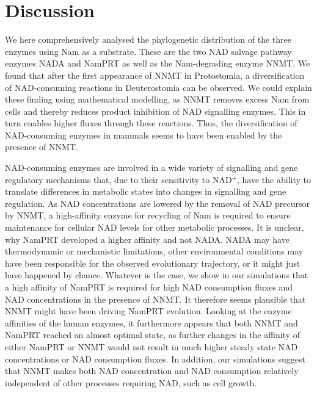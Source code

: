 
\section{Discussion}

We here comprehensively analysed the phylogenetic distribution of the three enzymes using Nam as a substrate. These are the two NAD salvage pathway enzymes NADA and NamPRT as well as the Nam-degrading enzyme NNMT. We found that after the first appearance of NNMT in Protostomia, a diversification of NAD-consuming reactions in Deuterostomia can be observed. We could explain these finding using mathematical modelling, as NNMT removes excess Nam from cells and thereby reduces product inhibition of NAD signalling enzymes. This in turn enables higher fluxes through these reactions. Thus, the diversification of NAD-consuming enzymes in mammals seems to have been enabled by the presence of NNMT.

NAD-consuming enzymes are involved in a wide variety of signalling and gene regulatory mechanisms that, due to their sensitivity to NAD$^{+}$, have the ability to translate differences in metabolic states into changes in signalling and gene regulation. As NAD concentrations are lowered by the removal of NAD precursor by NNMT, a high-affinity enzyme for recycling of Nam is required to ensure maintenance for cellular NAD levels for other metabolic processes. It is unclear, why NamPRT developed a higher affinity and not NADA. NADA may have thermodynamic or mechanistic limitations, other environmental conditions may have been responsible for the observed evolutionary trajectory, or it might just have happened by chance.  Whatever is the case, we show in our simulations that a high affinity of NamPRT is required for high NAD consumption fluxes and NAD concentrations in the presence of NNMT. It therefore seems plausible that NNMT might have been driving NamPRT evolution. Looking at the enzyme affinities of the human enzymes, it furthermore appears that both NNMT and NamPRT reached an almost optimal state, as further changes in the affinity of either  NamPRT or NNMT would not result in much higher steady state NAD concentrations or NAD consumption fluxes. In addition, our simulations suggest that NNMT makes both NAD concentration and NAD consumption relatively independent of other processes requiring NAD, such as cell growth.

